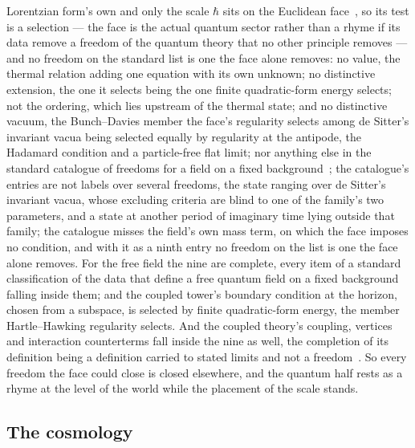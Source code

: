 \documentclass[11pt,a4paper]{article}
\theoremstyle{plain}
\theoremstyle{definition}
\begin{document}
Lorentzian form's own and only the scale $\hbar$ sits on the Euclidean face~\cite{JanzenBoundary}, so its test
is a selection --- the face is the actual quantum sector rather than a rhyme if its data remove a freedom of
the quantum theory that no other principle removes --- and no freedom on the standard list is one the face alone removes: no value,
the thermal relation adding one equation with its own unknown; no distinctive extension, the one it selects
being the one finite quadratic-form energy selects; not the ordering, which lies upstream of the thermal state; and no distinctive vacuum, the Bunch--Davies member the face's regularity selects among de Sitter's invariant vacua being selected equally by regularity at the antipode, the Hadamard condition and a particle-free flat limit; nor anything else in the standard catalogue of freedoms for a field on a fixed background~\cite{JanzenCanonicalTime,JanzenCRframework}; the catalogue's entries are not labels over several freedoms, the state ranging over de Sitter's invariant vacua, whose excluding criteria are blind to one of the family's two parameters, and a state at another period of imaginary time lying outside that family; the catalogue misses the field's own mass term, on which the face imposes no condition, and with it as a ninth entry no freedom on the list is one the face alone removes. For the free field the nine are complete, every item of a standard classification of the data that define a free quantum field on a fixed background falling inside them; and the coupled tower's boundary condition at the horizon, chosen from a subspace, is selected by finite quadratic-form energy, the member Hartle--Hawking regularity selects. And the coupled theory's coupling, vertices and interaction counterterms fall inside the nine as well, the completion of its definition being a definition carried to stated limits and not a freedom~\cite{JanzenCRframework}. So every freedom the face could close is closed elsewhere, and the quantum half rests as a rhyme at the level of the world while the placement of the scale stands.

\subsection{The cosmology}
\end{document}
